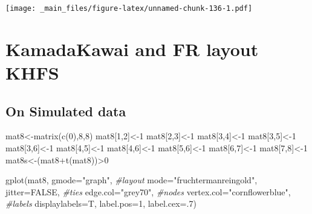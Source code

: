 \documentclass[
  notitlepage,
  onecolumn,
  openany]{book}
\newenvironment{Shaded}{\begin{snugshade}}{\end{snugshade}}
\newcommand{\AttributeTok}[1]{\textcolor[rgb]{0.77,0.63,0.00}{#1}}
\newcommand{\CommentTok}[1]{\textcolor[rgb]{0.56,0.35,0.01}{\textit{#1}}}
\newcommand{\ConstantTok}[1]{\textcolor[rgb]{0.00,0.00,0.00}{#1}}
\newcommand{\DecValTok}[1]{\textcolor[rgb]{0.00,0.00,0.81}{#1}}
\newcommand{\FunctionTok}[1]{\textcolor[rgb]{0.00,0.00,0.00}{#1}}
\newcommand{\NormalTok}[1]{#1}
\newcommand{\OtherTok}[1]{\textcolor[rgb]{0.56,0.35,0.01}{#1}}
\newcommand{\SpecialCharTok}[1]{\textcolor[rgb]{0.00,0.00,0.00}{#1}}
\newcommand{\StringTok}[1]{\textcolor[rgb]{0.31,0.60,0.02}{#1}}
\begin{document}
\texttt{[image: \_main\_files/figure-latex/unnamed-chunk-136-1.pdf]}

\hypertarget{kamadakawai-and-fr-layout-khfs}{%
\section{KamadaKawai and FR layout KHFS}\label{kamadakawai-and-fr-layout-khfs}}

\hypertarget{on-simulated-data}{%
\subsection{On Simulated data}\label{on-simulated-data}}

\begin{Shaded}
\begin{Highlighting}[]
\NormalTok{mat8}\OtherTok{\textless{}{-}}\FunctionTok{matrix}\NormalTok{(}\FunctionTok{c}\NormalTok{(}\DecValTok{0}\NormalTok{),}\DecValTok{8}\NormalTok{,}\DecValTok{8}\NormalTok{)}
\NormalTok{mat8[}\DecValTok{1}\NormalTok{,}\DecValTok{2}\NormalTok{]}\OtherTok{\textless{}{-}}\DecValTok{1}
\NormalTok{mat8[}\DecValTok{2}\NormalTok{,}\DecValTok{3}\NormalTok{]}\OtherTok{\textless{}{-}}\DecValTok{1}
\NormalTok{mat8[}\DecValTok{3}\NormalTok{,}\DecValTok{4}\NormalTok{]}\OtherTok{\textless{}{-}}\DecValTok{1}
\NormalTok{mat8[}\DecValTok{3}\NormalTok{,}\DecValTok{5}\NormalTok{]}\OtherTok{\textless{}{-}}\DecValTok{1}
\NormalTok{mat8[}\DecValTok{3}\NormalTok{,}\DecValTok{6}\NormalTok{]}\OtherTok{\textless{}{-}}\DecValTok{1}
\NormalTok{mat8[}\DecValTok{4}\NormalTok{,}\DecValTok{5}\NormalTok{]}\OtherTok{\textless{}{-}}\DecValTok{1}
\NormalTok{mat8[}\DecValTok{4}\NormalTok{,}\DecValTok{6}\NormalTok{]}\OtherTok{\textless{}{-}}\DecValTok{1}
\NormalTok{mat8[}\DecValTok{5}\NormalTok{,}\DecValTok{6}\NormalTok{]}\OtherTok{\textless{}{-}}\DecValTok{1}
\NormalTok{mat8[}\DecValTok{6}\NormalTok{,}\DecValTok{7}\NormalTok{]}\OtherTok{\textless{}{-}}\DecValTok{1}
\NormalTok{mat8[}\DecValTok{7}\NormalTok{,}\DecValTok{8}\NormalTok{]}\OtherTok{\textless{}{-}}\DecValTok{1}
\NormalTok{mat8s}\OtherTok{\textless{}{-}}\NormalTok{(mat8}\SpecialCharTok{+}\FunctionTok{t}\NormalTok{(mat8))}\SpecialCharTok{\textgreater{}}\DecValTok{0}

\FunctionTok{gplot}\NormalTok{(mat8, }
      \AttributeTok{gmode=}\StringTok{"graph"}\NormalTok{,}
      \CommentTok{\#layout}
      \AttributeTok{mode=}\StringTok{"fruchtermanreingold"}\NormalTok{,}
      \AttributeTok{jitter=}\ConstantTok{FALSE}\NormalTok{,}
      \CommentTok{\#ties}
      \AttributeTok{edge.col=}\StringTok{"grey70"}\NormalTok{,}
      \CommentTok{\#nodes}
      \AttributeTok{vertex.col=}\StringTok{"cornflowerblue"}\NormalTok{,}
      \CommentTok{\#labels}
      \AttributeTok{displaylabels=}\NormalTok{T,}
      \AttributeTok{label.pos=}\DecValTok{1}\NormalTok{,}
      \AttributeTok{label.cex=}\NormalTok{.}\DecValTok{7}\NormalTok{)}
\end{Highlighting}
\end{Shaded}
\end{document}
